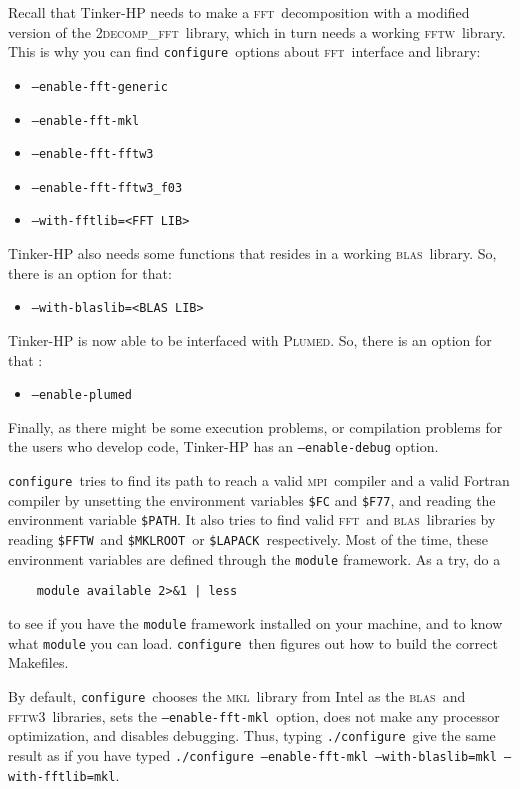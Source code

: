 \documentclass[peerreview]{IEEEtran}
\def\fft{\textsc{fft}}
\def\fftw{\textsc{fftw}}
\def\mkl{\textsc{mkl}}
\def\LAPACK{\texttt{\$LAPACK}}
\def\MKLROOT{\texttt{\$MKLROOT}}
\def\FFTW{\texttt{\$FFTW}}
\def\PATH{\texttt{\$PATH}}
\def\mpi{\textsc{mpi}}
\def\blas{\textsc{blas}}
\def\fftwt{\textsc{fftw3}}
\def\decomp{\textsc{2decomp\_fft}}
\def\config{\texttt{configure}}
\def\configp{\texttt{./}\config}
\def\plumed{\textsc{Plumed}}
\def\enaplumed{\texttt{--enable-plumed}}
\def\enafftgen{\texttt{--enable-fft-generic}}
\def\enafftmkl{\texttt{--enable-fft-mkl\hskip5em}}
\def\enafftw{\texttt{--enable-fft-fftw3}}
\def\enafftwf{\texttt{--enable-fft-fftw3\_f03}}
\def\enafftmkl{\texttt{--enable-fft-mkl}}
\def\withfft{\texttt{--with-fftlib=}}
\def\withfftlib{\withfft\texttt{<FFT LIB>}}
\def\withblas{\texttt{--with-blaslib=}}
\def\withblaslib{\withblas\texttt{<BLAS LIB>}}
\begin{document}
Recall that Tinker-HP needs to make a \fft\  decomposition with a modified version of the \decomp\ library, which in turn needs a working \fftw\  library. This is why you can find \config\ options about \fft\  interface and library:
\begin{itemize}
    \item[] \enafftgen
    \item[] \enafftmkl
    \item[] \enafftw
    \item[] \enafftwf
    \item[] \withfftlib
\end{itemize}

Tinker-HP also needs some functions that resides in a working  \blas\ library. So, there is an option for that:
\begin{itemize}
    \item[] \withblaslib
\end{itemize}

Tinker-HP is now able to be interfaced with \plumed. So, there is an option for that :
\begin{itemize}
    \item [] \enaplumed
\end{itemize}

Finally, as there might be some execution problems, or compilation problems for the users who develop code, Tinker-HP has an \texttt{--enable-debug} option.

\vskip5mm
\config\ tries to find its path to reach a valid \mpi\ compiler and  a valid Fortran compiler by unsetting the environment variables \texttt{\$FC} and \texttt{\$F77}, and reading the environment variable \PATH. It also tries to find  valid \fft\  and  \blas\ libraries by reading \FFTW\ and \MKLROOT\ or \LAPACK\  respectively. Most of the time, these environment variables are defined through the \texttt{module} framework. As a try, do a 
\begin{verbatim}
    module available 2>&1 | less
\end{verbatim}

to see if you have the \texttt{module} framework installed on your machine, and to know what \texttt{module} you can load.  \config\ then figures out how to build the correct Makefiles.

By default, \config\ chooses the \mkl\  library from Intel as the \blas\ and \fftwt\ libraries, sets the \enafftmkl\ option, does not make any processor optimization, and disables debugging. Thus, typing \configp\ give the same result as if you have typed \configp\ \enafftmkl\ \withblas\texttt{mkl}\  \withfft\texttt{mkl}.
\end{document}
